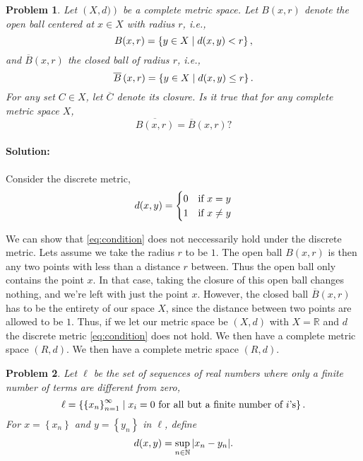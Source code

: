 \documentclass[a4paper]{article}
\newtheorem{prb}{Problem}
\theoremstyle{plain}
\begin{document}
\begin{prb}
Let $\left( X, d) \right)$ be a complete metric space. Let $B(x, r)$ denote the open ball
centered at $x \in X$ with radius $r$, i.e., 
\begin{equation}
  \notag
  B(x, r) = \left\{ y \in X \mid d(x, y) < r \right\},
\end{equation}
and $\overline{B}\left( x, r \right)$ the closed ball of radius $r$, i.e.,
\begin{equation}
  \notag
  \overline{B}\left( x, r \right) = \left\{ y \in X \mid d(x, y) \leq r \right\}.
\end{equation}
For any set $C \in X$, let $\overline{C}$ denote its closure.
Is it true that for any complete metric space $X$, 
\begin{equation}
  \label{eq:condition}
  \overline{B\left( x, r \right)} = \overline{B}\left( x, r \right)?
\end{equation}
\end{prb}

\paragraph{Solution: }

Consider the discrete metric,
\begin{equation}
  \notag
  d(x, y) = \begin{cases}
    0 & \text{if } x = y \\
    1 & \text{if } x \neq y
  \end{cases}
\end{equation}

We can show that \eqref{eq:condition} does not neccessarily hold under the
discrete metric.  Lets assume we take the radius $r$ to be $1$.  The open ball
$B(x, r)$ is then any two points with less than a distance $r$ between.  Thus
the open ball only contains the point $x$. In that case, taking the closure of
this open ball changes nothing, and we're left with just the point $x$.
However, the closed ball $\overline{B}\left( x, r \right)$ has to be the
entirety of our space $X$, since the distance between two points are allowed to
be $1$.  Thus, if we let our metric space be $(X, d)$ with $X = \mathbb{R}$ and
$d$ the discrete metric \eqref{eq:condition} does not hold. We then have a
complete metric space $(R, d)$. We then have a complete metric space $(R, d)$.

\begin{prb}
Let $\ell$ be the set of sequences of real numbers where only a finite number of terms
are different from zero,
\begin{equation}
  \notag
  \ell = \left\{ \left\{ x_n \right\}_{n=1}^{\infty} \mid x_i = 0 \text{ for all but a finite number of $i$'s} \right\}.
\end{equation}
For $x = \left\{ x_n \right\}$ and $y = \left\{ y_n \right\}$ in $\ell$, define
\begin{equation}
  \notag 
  d(x, y) = \sup_{n\in\mathbb{N}} |x_n - y_n|.
\end{equation}
\end{prb}
\end{document}

